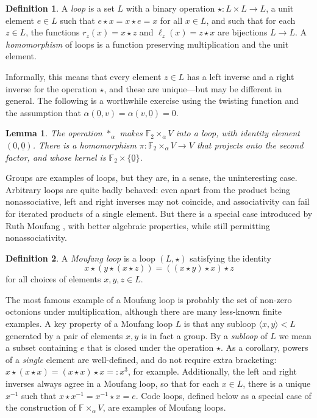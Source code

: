 \documentclass{article}
\theoremstyle{plain}
\newtheorem{lemma}{Lemma}
\theoremstyle{definition}
\newtheorem*{definition}{Definition}
\def \FF {\mathbb{F}}
\begin{document}
\begin{definition}
A \emph{loop} is a set $L$ with a binary operation $\star\colon L\times L \to L$, a unit element $e\in L$ such that $e\star x = x \star e = x$ for all $x\in L$, and such that for each $z\in L$, the functions $r_z(x) = x \star z$ and $\ell_z(x)=z\star x$ are bijections $L\to L$. A \emph{homomorphism} of loops is a function preserving multiplication and the unit element.
\end{definition}

Informally, this means that every element $z\in L$ has a left inverse and a right inverse for the operation $\star$, and these are unique---but may be different in general. 
The following is a worthwhile exercise using the twisting function and the assumption that $\alpha(\underline{0},v)=\alpha(v,\underline{0})=0$.

\begin{lemma}
The operation $\ast_\alpha$ makes $\FF_2\times_\alpha V$ into a loop, with identity element $(0,\underline{0})$.
There is a homomorphism $\pi\colon \FF_2\times_\alpha V \to V$ that projects onto the second factor, and whose kernel is $\FF_2 \times\{\underline{0}\}$.
\end{lemma}

Groups are examples of loops, but they are, in a sense, the uninteresting case. 
Arbitrary loops are quite badly behaved: even apart from the product being nonassociative, left and right inverses may not coincide, and associativity can fail for iterated products of a single element. 
But there is a special case introduced by Ruth Moufang \cite{Moufang}, with better algebraic properties, while still permitting nonassociativity.

\begin{definition}
A \emph{Moufang loop} is a loop $(L,\star)$ satisfying the identity
\[
x \star (y \star (x \star z)) = ((x \star y) \star x) \star z
\]
for all choices of elements $x,y,z\in L$.
\end{definition}

The most famous example of a Moufang loop is probably the set of non-zero octonions under multiplication, although there are many less-known finite examples. 
A key property of a Moufang loop $L$ is that any subloop $\langle x,y\rangle < L$ generated by a pair of elements $x,y$ is in fact a group. 
By a \emph{subloop} of $L$ we mean a subset containing $e$ that is closed under the operation $\star$.
As a corollary, powers of a \emph{single} element are well-defined, and do not require extra bracketing: $x\star (x \star x) = (x\star x) \star x =: x^3$, for example. 
Additionally, the left and right inverses always agree in a Moufang loop, so that for each $x\in L$, there is a unique $x^{-1}$ such that $x\star x^{-1} = x^{-1}\star x = e$. 
Code loops, defined below as a special case of the construction of $\FF\times_\alpha V$, are examples of Moufang loops.
\end{document}
